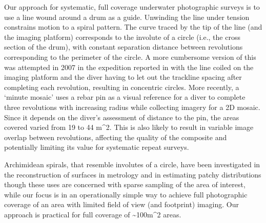 Our approach for systematic, full coverage underwater photographic surveys is to use a line wound around a drum as a guide. Unwinding the line under tension constrains motion to a spiral pattern. The curve traced by the tip of the line (and the imaging platform) corresponds to the involute of a circle (i.e., the cross section of the drum), with constant separation distance between revolutions corresponding to the perimeter of the circle. A more cumbersome version of this was attempted in 2007 in the expedition reported in \cite{Camilli_2007} with the line coiled on the imaging platform and the diver having to let out the trackline spacing after completing each revolution, resulting in concentric circles. More recently, a `minute mosaic' \cite{gintert2012third} uses a rebar pin as a visual reference for a diver to complete three revolutions with increasing radius while collecting imagery for a 2D mosaic. Since it depends on the diver's assessment of distance to the pin, the areas covered varied from 19 to 44 m^{2}. This is also likely to result in variable image overlap between revolutions, affecting the quality of the composite and potentially limiting its value for systematic repeat surveys.

Archimidean spirals, that resemble involutes of a circle, have been investigated in the reconstruction of surfaces in metrology \cite{Wieczorowski_2001} and in estimating patchy distributions \cite{Kalikhman_2006} though these uses are concerned with sparse sampling of the area of interest, while our focus is in an operationally simple way to achieve full photographic coverage of an area with limited field of view (and footprint) imaging. Our approach is practical for full coverage of \sim{100m^{2}} areas.

  